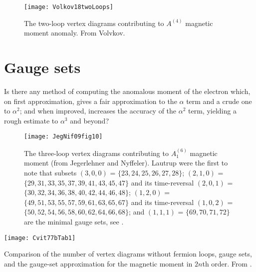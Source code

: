 \begin{figure}
\begin{center}
\texttt{[image: Volkov18twoLoops]}
\end{center}
\caption{\label{Volkov18twoLoops}
The two-loop vertex diagrams contributing to $A^{(4)}$ magnetic moment
anomaly.
From Volvkov.
}
 \end{figure}



\section{Gauge sets}
\label{sect:finitness}

\begin{bartlett}{
Is there any method of computing the anomalous moment of the
electron which, on first approximation, gives a fair approximation to the
$\alpha$ term and a crude one to $\alpha^2$; and when improved, increases
the accuracy of the $\alpha^2$ term, yielding a rough estimate to
$\alpha^3$ and beyond?
        }
\end{bartlett}

\bigskip

\begin{figure}
\begin{center}
\texttt{[image: JegNif09fig10]}
\end{center}
\caption{\label{JegNif09fig10}
The three-loop vertex diagrams contributing to $A^{(6)}_1$
magnetic moment
(from Jegerlehner and Nyffeler).
Lautrup \etal{} were the first to note that
subsets
$(3,0,0)$ = $\{23,24,25,26,27,28\}$;
$(2,1,0)$ = $\{29,31,33,35,37,39,41,43,45,47\}$ and its time-reversal
$(2,0,1)$ = $\{30,32,34,36,38,40,42,44,46,48\}$;
$(1,2,0)$ = $\{49,51,53,55,57,59,61,63,65,67\}$ and its time-reversal
$(1,0,2)$ = $\{50,52,54,56,58,60,62,64,66,68\}$;
and
$(1,1,1)$ = $\{69,70,71,72\}$
are the minimal gauge sets, see .
}
 \end{figure}

\begin{table}
\begin{center}
\texttt{[image: Cvit77bTab1]}
\end{center}
\caption{\label{Cvit77bTab1}
Comparison of the number of vertex diagrams without fermion loops, gauge
sets, and the gauge-set approximation  for the magnetic
moment in $2n$th order.
From .
}
\end{table}

